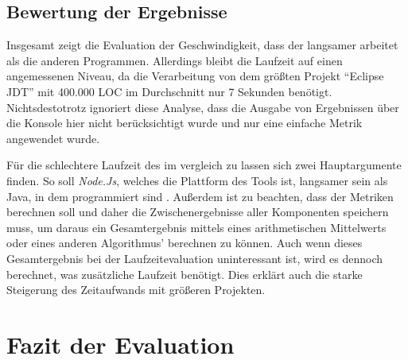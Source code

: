 \subsection{Bewertung der Ergebnisse}
Insgesamt zeigt die Evaluation der Geschwindigkeit, dass der \doceval langsamer arbeitet als die anderen Programmen. Allerdings  bleibt die Laufzeit auf einen angemessenen Niveau, da die Verarbeitung von dem größten Projekt \enquote{Eclipse JDT} mit 400.000 \ac{LOC} im Durchschnitt nur 7 Sekunden benötigt. Nichtsdestotrotz ignoriert diese Analyse, dass die Ausgabe von Ergebnissen über die Konsole hier nicht berücksichtigt wurde und nur eine einfache Metrik angewendet wurde.

Für die schlechtere Laufzeit des \doceval im vergleich zu \checkpmd lassen sich zwei Hauptargumente finden. So soll \textit{Node.Js}, welches die Plattform des Tools ist, langsamer sein als Java, in dem \checkpmd programmiert sind \cite{node_java_speed}.  Außerdem ist zu beachten, dass der \doceval Metriken berechnen soll und daher die Zwischenergebnisse aller Komponenten speichern muss, um daraus ein Gesamtergebnis mittels eines arithmetischen Mittelwerts oder eines anderen Algorithmus' berechnen zu können. Auch wenn dieses Gesamtergebnis bei der Laufzeitevaluation uninteressant ist, wird es dennoch berechnet, was zusätzliche Laufzeit benötigt. Dies erklärt auch die starke Steigerung des Zeitaufwands mit größeren Projekten.

\section{Fazit der Evaluation}